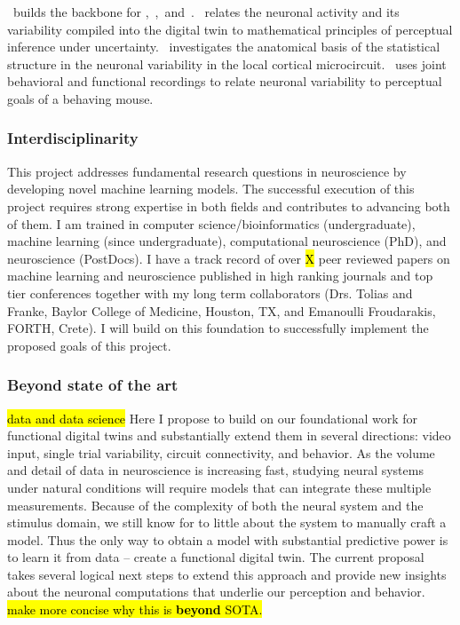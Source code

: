 \documentclass[COG,11pt]{ercgrant}
\begin{document}
\obji~builds the backbone for \objii,~\objiii,~and~\objiv. \objii~relates the neuronal activity and its variability compiled into the digital twin to mathematical principles of perceptual inference under uncertainty. \objiii~investigates the anatomical basis of the statistical structure in the neuronal variability in the local cortical microcircuit. \objiv~uses joint behavioral and functional recordings to relate neuronal variability to perceptual goals of a behaving mouse. 

\subsubsection{Interdisciplinarity}
This project addresses fundamental research questions in neuroscience by developing novel machine learning models. The successful execution of this project requires strong expertise in both fields and contributes to advancing both of them. I am trained in computer science/bioinformatics (undergraduate), machine learning (since undergraduate), computational neuroscience (PhD), and neuroscience (PostDocs). I have a track record of over \hl{X} peer reviewed papers on machine learning and neuroscience published in high ranking journals and top tier conferences together with my long term collaborators (Drs. Tolias and Franke, Baylor College of Medicine, Houston, TX, and Emanoulli Froudarakis, FORTH, Crete). I will build on this foundation to successfully implement the proposed goals of this project. 

\subsubsection{Beyond state of the art}
\hl{data and data science}
Here I propose to build on our foundational work for functional digital twins and substantially extend them in several directions: video input, single trial variability, circuit connectivity, and behavior. As the volume and detail of data in neuroscience is increasing fast, studying neural systems under natural conditions will require models that can integrate these multiple measurements. Because of the complexity of both the neural system and the stimulus domain, we still know for to little about the system to manually craft a model. Thus the only way to obtain a model with substantial predictive power is to learn it from data -- create a functional digital twin. The current proposal takes several logical next steps to extend this approach and provide new insights about the neuronal computations that underlie our perception and behavior. 
\hl{make more concise why this is \textbf{beyond} SOTA. }
\end{document}
